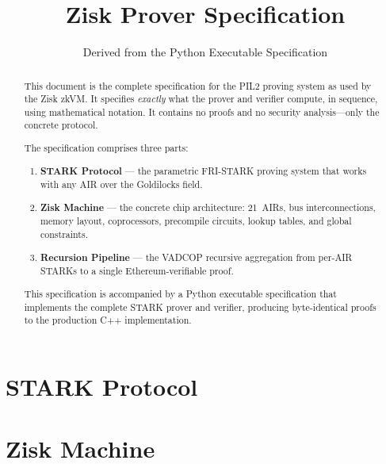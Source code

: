 \documentclass[11pt,a4paper]{report}
\title{Zisk Prover Specification}
\author{Derived from the Python Executable Specification}
\date{}
\begin{document}
\maketitle

\begin{abstract}
This document is the complete specification for the PIL2 proving system
as used by the Zisk zkVM.
It specifies \emph{exactly} what the prover and verifier compute, in sequence,
using mathematical notation.
It contains no proofs and no security analysis---only the concrete protocol.

The specification comprises three parts:
\begin{enumerate}[nosep]
  \item \textbf{STARK Protocol} --- the parametric FRI-STARK proving system
        that works with any AIR over the Goldilocks field.
  \item \textbf{Zisk Machine} --- the concrete chip architecture:
        21~AIRs, bus interconnections, memory layout, coprocessors,
        precompile circuits, lookup tables, and global constraints.
  \item \textbf{Recursion Pipeline} --- the VADCOP recursive aggregation
        from per-AIR STARKs to a single Ethereum-verifiable proof.
\end{enumerate}

This specification is accompanied by a Python executable specification
that implements the complete STARK prover and verifier,
producing byte-identical proofs to the production C++ implementation.
\end{abstract}

\tableofcontents
\newpage

\part{STARK Protocol}
\label{part:stark}



\part{Zisk Machine}
\label{part:machine}
\end{document}
